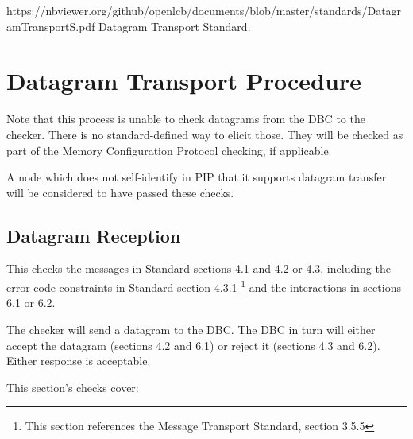 



\maketitle
\thispagestyle{firststyle}

\introductionCaveats
{https://nbviewer.org/github/openlcb/documents/blob/master/standards/DatagramTransportS.pdf}
{Datagram Transport Standard}.

\section{Datagram Transport Procedure}


Note that this process is unable to check datagrams from the DBC to the checker.
There is no standard-defined way to elicit those.  They will be checked as part of the 
Memory Configuration Protocol checking, if applicable.

A node which does not self-identify in PIP that it supports
datagram transfer will be considered to have passed these checks.
\pipsetFootnote

\subsection{Datagram Reception}

This checks the messages in Standard sections 4.1 and 4.2 or 4.3, 
including the error code constraints in Standard section 4.3.1
\footnote{This section references the Message Transport Standard, 
section 3.5.5}
and the interactions in sections 6.1 or 6.2.

The checker will send a datagram to the DBC. The DBC in turn will 
either accept the datagram (sections 4.2 and 6.1) or 
reject it (sections 4.3 and 6.2). Either response is acceptable.

This section's checks cover:


